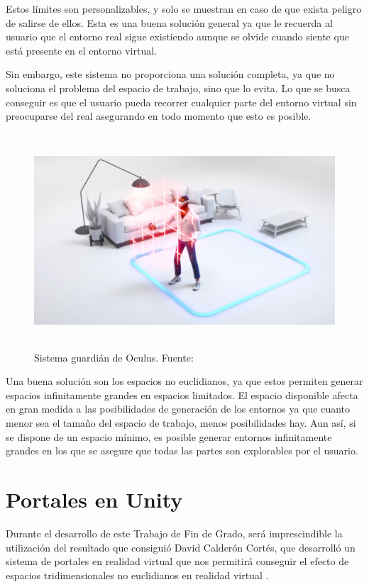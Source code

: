 \documentclass[../main.tex]{subfiles}
\begin{document}
Estos límites son personalizables, y solo se muestran en caso de que exista peligro de salirse de ellos. Esta es una buena solución general ya que le recuerda al usuario que el entorno real sigue existiendo aunque se olvide cuando siente que está presente en el entorno virtual.

Sin embargo, este sistema no proporciona una solución completa, ya que no soluciona el problema del espacio de trabajo, sino que lo evita. Lo que se busca conseguir es que el usuario pueda recorrer cualquier parte del entorno virtual sin preocuparse del real asegurando en todo momento que esto es posible. 

\begin{figure}[h!]
\centering
\includegraphics[height=8cm, width=12cm]{imagenes/Sistema_Guardian.png}
\caption{Sistema guardián de Oculus. Fuente:\cite{Sistema_Guardian}}
\label{fig:Sistema_Guardian}
\end{figure}

Una buena solución son los espacios no euclidianos, ya que estos permiten generar espacios infinitamente grandes en espacios limitados. El espacio disponible afecta en gran medida a las posibilidades de generación de los entornos ya que cuanto menor sea el tamaño del espacio de trabajo, menos posibilidades hay. Aun así, si se dispone de un espacio mínimo, es posible generar entornos infinitamente grandes en los que se asegure que todas las partes son explorables por el usuario.

\section{Portales en Unity} \label{Unity_Portals}
Durante el desarrollo de este Trabajo de Fin de Grado, será imprescindible la utilización del resultado que consiguió David Calderón Cortés, que desarrolló un sistema de portales en realidad virtual que nos permitirá conseguir el efecto de espacios tridimensionales no euclidianos en realidad virtual \cite{TFG_David}.
\end{document}
